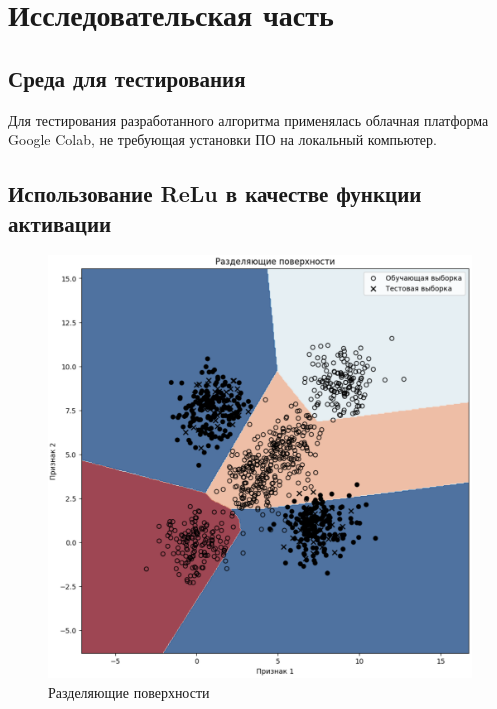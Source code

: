\chapter{Исследовательская часть}

\section{Среда для тестирования}

Для тестирования разработанного алгоритма применялась облачная платформа Google Colab, не требующая установки ПО на локальный компьютер.

\section{Использование ReLu в качестве функции активации}

\begin{figure}
	\begin{center}
		\includegraphics[width=\textwidth]{images/1.png}
	\end{center}
	\caption{Разделяющие поверхности}
	\label{img:1}
\end{figure}

